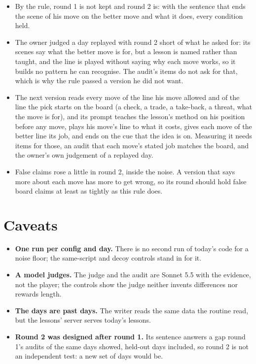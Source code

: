 \documentclass[11pt]{article}
\begin{document}
\begin{itemize}[nosep]
\item By the rule, round 1 is not kept and round 2 is: with the sentence that ends the scene of his
  move on the better move and what it does, every condition held.
\item The owner judged a day replayed with round 2 short of what he asked for: its scenes say what
  the better move is for, but a lesson is named rather than taught, and the line is played without
  saying why each move works, so it builds no pattern he can recognise. The audit's items do not
  ask for that, which is why the rule passed a version he did not want.
\item The next version reads every move of the line his move allowed and of the line the pick
  starts on the board (a check, a trade, a take-back, a threat, what the move is for), and its
  prompt teaches the lesson's method on his position before any move, plays his move's line to
  what it costs, gives each move of the better line its job, and ends on the cue that the idea is
  on. Measuring it needs items for those, an audit that each move's stated job matches the board,
  and the owner's own judgement of a replayed day.
\item False claims rose a little in round 2, inside the noise. A version that says more about each
  move has more to get wrong, so its round should hold false board claims at least as tightly as
  this rule does.
\end{itemize}

\section{Caveats}

\begin{itemize}[nosep]
\item \textbf{One run per config and day.} There is no second run of today's code for a noise floor;
  the same-script and decoy controls stand in for it.
\item \textbf{A model judges.} The judge and the audit are Sonnet 5.5 with the evidence, not the
  player; the controls show the judge neither invents differences nor rewards length.
\item \textbf{The days are past days.} The writer reads the same data the routine read, but the
  lessons' server serves today's lessons.
\item \textbf{Round 2 was designed after round 1.} Its sentence answers a gap round 1's audits of
  the same days showed, held-out days included, so round 2 is not an independent test: a new set of
  days would be.
\end{itemize}
\end{document}
